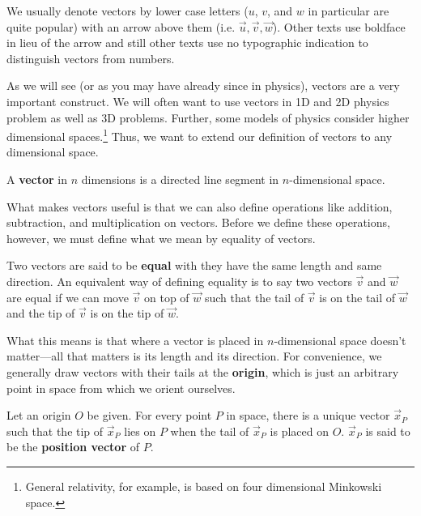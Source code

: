 We usually denote vectors by lower case letters ($u$, $v$, and $w$ in particular are quite popular) with an arrow above them (i.e. $\vec{u}, \vec{v}, \vec{w}$). Other texts use boldface in lieu of the arrow and still other texts use no typographic indication to distinguish vectors from numbers.

As we will see (or as you may have already since in physics), vectors are a very important construct. We will often want to use vectors in 1D and 2D physics problem as well as 3D problems. Further, some models of physics consider higher dimensional spaces.\footnote{General relativity, for example, is based on four dimensional Minkowski space.} Thus, we want to extend our definition of vectors to any dimensional space.

\begin{definition}
	A \textbf{vector} in $n$ dimensions is a directed line segment in $n$-dimensional space.
\end{definition}

What makes vectors useful is that we can also define operations like addition, subtraction, and multiplication on vectors. Before we define these operations, however, we must define what we mean by equality of vectors.

\begin{definition}
	Two vectors are said to be \textbf{equal} with they have the same length and same direction. An equivalent way of defining equality is to say two vectors $\vec{v}$ and $\vec{w}$ are equal if we can move $\vec{v}$ on top of $\vec{w}$ such that the tail of $\vec{v}$ is on the tail of $\vec{w}$ and the tip of $\vec{v}$ is on the tip of $\vec{w}$.
\end{definition}

What this means is that where a vector is placed in $n$-dimensional space doesn't matter---all that matters is its length and its direction. For convenience, we generally draw vectors with their tails at the \textbf{origin}, which is just an arbitrary point in space from which we orient ourselves.

\begin{proposition}
	Let an origin $O$ be given. For every point $P$ in space, there is a unique vector $\vec{x}_P$ such that the tip of $\vec{x}_P$ lies on $P$ when the tail of $\vec{x}_P$ is placed on $O$. $\vec{x}_P$ is said to be the \textbf{position vector} of $P$.
\end{proposition}

